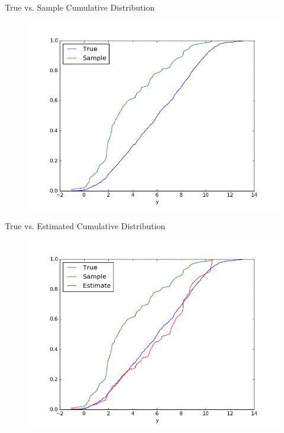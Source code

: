 \documentclass{beamer}
\begin{document}
\begin{frame}{True vs. Sample Cumulative Distribution}
	\vfill
	\begin{figure}
		\includegraphics[width=1\textwidth]{figs/dstand_cdf1.png}
	\end{figure}
	\vfill
\end{frame}

\begin{frame}{True vs. Estimated Cumulative Distribution}
	\vfill
	\begin{figure}
		\includegraphics[width=1\textwidth]{figs/dstand_cdf2.png}
	\end{figure}
	\vfill
\end{frame}
\end{document}
